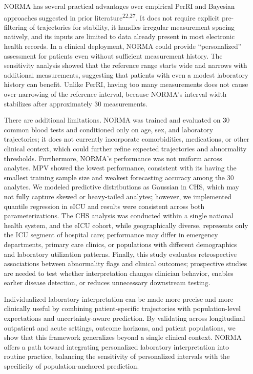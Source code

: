 \documentclass[11pt]{article}
\begin{document}
NORMA has several practical advantages over empirical PerRI and Bayesian approaches suggested in prior literature\textsuperscript{22,27}. It does not require explicit pre-filtering of trajectories for stability, it handles irregular measurement spacing natively, and its inputs are limited to data already present in most electronic health records. In a clinical deployment, NORMA could provide ``personalized'' assessment for patients even without sufficient measurement history. The sensitivity analysis showed that the reference range starts wide and narrows with additional measurements, suggesting that patients with even a modest laboratory history can benefit. Unlike PerRI, having too many measurements does not cause over-narrowing of the reference interval, because NORMA's interval width stabilizes after approximately 30 measurements.

There are additional limitations. NORMA was trained and evaluated on 30 common blood tests and conditioned only on age, sex, and laboratory trajectories; it does not currently incorporate comorbidities, medications, or other clinical context, which could further refine expected trajectories and abnormality thresholds. Furthermore, NORMA's performance was not uniform across analytes. MPV showed the lowest performance, consistent with its having the smallest training sample size and weakest forecasting accuracy among the 30 analytes. We modeled predictive distributions as Gaussian in CHS, which may not fully capture skewed or heavy-tailed analytes; however, we implemented quantile regression in eICU and results were consistent across both parameterizations. The CHS analysis was conducted within a single national health system, and the eICU cohort, while geographically diverse, represents only the ICU segment of hospital care; performance may differ in emergency departments, primary care clinics, or populations with different demographics and laboratory utilization patterns. Finally, this study evaluates retrospective associations between abnormality flags and clinical outcomes; prospective studies are needed to test whether interpretation changes clinician behavior, enables earlier disease detection, or reduces unnecessary downstream testing.

Individualized laboratory interpretation can be made more precise and more clinically useful by combining patient-specific trajectories with population-level expectations and uncertainty-aware prediction. By validating across longitudinal outpatient and acute settings, outcome horizons, and patient populations, we show that this framework generalizes beyond a single clinical context. NORMA offers a path toward integrating personalized laboratory interpretation into routine practice, balancing the sensitivity of personalized intervals with the specificity of population-anchored prediction.
\end{document}
